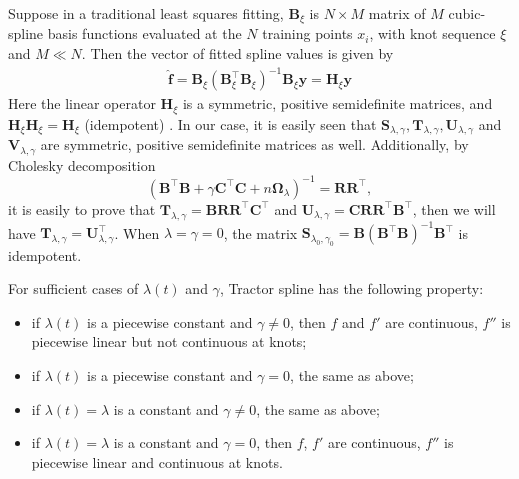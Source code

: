 Suppose in a traditional least squares fitting, $\mathbf{B}_\xi$ is $N \times M$ matrix of $M$ cubic-spline basis functions evaluated at the $N$ training points $x_i$, with knot sequence $\xi$ and $M \ll N$. Then the vector of fitted spline values is given by
\begin{align}\label{fhy}
\hat{\mathbf{f}}=\mathbf{B}_\xi(\mathbf{B}^\top_\xi\mathbf{B}_\xi)^{-1}\mathbf{B}_\xi\mathbf{y}=\mathbf{H}_\xi\mathbf{y}
\end{align}
Here the linear operator $\mathbf{H}_\xi$ is a symmetric, positive semidefinite matrices, and $\mathbf{H}_\xi\mathbf{H}_\xi=\mathbf{H}_\xi$ (idempotent) \cite{esl2009}. In our case, it is easily seen that $\mathbf{S}_{\lambda,\gamma}, \mathbf{T}_{\lambda,\gamma}, \mathbf{U}_{\lambda,\gamma}$ and $\mathbf{V}_{\lambda,\gamma}$ are symmetric, positive semidefinite matrices as well. Additionally, by Cholesky decomposition
\begin{equation}
(\mathbf{B}^\top\mathbf{B}+\gamma\mathbf{C}^\top\mathbf{C}+n\mathbf{\Omega}_{\lambda})^{-1}=\mathbf{R}\mathbf{R}^\top,
\end{equation}
it is easily to prove that $\mathbf{T}_{\lambda,\gamma}=\mathbf{B}\mathbf{R}\mathbf{R}^\top\mathbf{C}^\top$ and $\mathbf{U}_{\lambda,\gamma}=\mathbf{C}\mathbf{R}\mathbf{R}^\top\mathbf{B}^\top$, then we will have 
 $\mathbf{T}_{\lambda,\gamma}= \mathbf{U}_{\lambda,\gamma}^\top$. When $\lambda=\gamma=0$, the matrix $\mathbf{S}_{\lambda_0,\gamma_0}=\mathbf{B}(\mathbf{B}^\top\mathbf{B})^{-1}\mathbf{B}^\top$ is idempotent.  

For sufficient cases of $\lambda(t)$ and $\gamma$, Tractor spline has the following property:
\begin{itemize}
\item if $\lambda(t)$ is a piecewise constant and $\gamma \neq 0$, then $f$ and $f'$ are continuous, $f''$ is piecewise linear but not continuous at knots;
\item if $\lambda(t)$ is a piecewise constant and $\gamma = 0$, the same as above;
\item if $\lambda(t)=\lambda $ is a constant and $\gamma \neq 0$, the same as above;
\item if $\lambda(t)=\lambda $ is a constant and $\gamma = 0$, then $f$, $f'$ are continuous, $f''$ is piecewise linear and continuous at knots.
\end{itemize}

